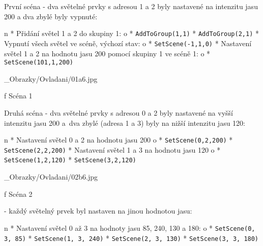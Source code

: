 
\medskip\noindent
{\sbf První scéna} - dva světelné prvky s adresou 1 a 2 byly nastavené na intenzitu jasu 200 a dva zbylé byly vypnuté:

\begitems \style n
* {\sbf Přidání} světel 1 a 2 do skupiny 1:
    \begitems \style o
        * {\tt AddToGroup(1,1)}
        * {\tt AddToGroup(2,1)}
    \enditems
* {\sbf Vypnutí} všech světel ve scéně, výchozí stav:
    \begitems \style o
        * {\tt SetScene(-1,1,0)}
    \enditems
* {\sbf Nastavení} světel 1 a 2 na hodnotu jasu 200 pomocí skupiny 1 ve scéně 1:
    \begitems \style o
        * {\tt SetScene(101,1,200)}
    \enditems
\enditems

\medskip {}
\picw=6.5cm _Obrazky/Ovladani/01a6.jpg
\caption/f Scéna 1
\medskip

\noindent
{\sbf Druhá scéna} - dva světelné prvky s adresou 0 a 2 byly nastavené na vyšší intenzitu jasu 200
a~dva zbylé (adresa 1 a 3) byly na nižší intenzitu jasu 120:

\begitems \style n
* {\sbf Nastavení} světel 0 a 2 na hodnotu jasu 200
    \begitems \style o
        * {\tt SetScene(0,2,200)}
        * {\tt SetScene(2,2,200)}
    \enditems
* {\sbf Nastavení} světel 1 a 3 na hodnotu jasu 120
    \begitems \style o
        * {\tt SetScene(1,2,120)}
        * {\tt SetScene(3,2,120)}
    \enditems

\enditems

\medskip {}
\picw=6.5cm _Obrazky/Ovladani/02b6.jpg
\caption/f Scéna 2
\medskip

\medskip
{} - každý světelný prvek byl nastaven na jinou hodnotou jasu:


\begitems \style n
* {\sbf Nastavení} světel 0 až 3 na hodnoty jasu 85, 240, 130 a 180:
    \begitems \style o
        * {\tt SetScene(0, 3, 85)}
        * {\tt SetScene(1, 3, 240)}
        * {\tt SetScene(2, 3, 130)}
        * {\tt SetScene(3, 3, 180)}
    \enditems

